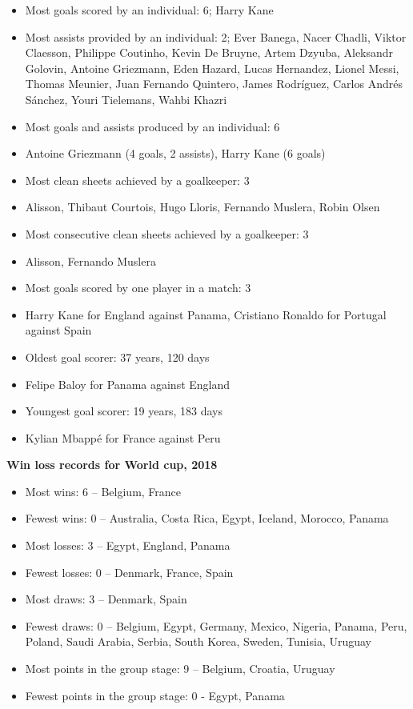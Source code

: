 \documentclass[
  openany]{book}
\providecommand{\tightlist}{%
  \setlength{\itemsep}{0pt}\setlength{\parskip}{0pt}}
\begin{document}
\begin{itemize}
\tightlist
\item
  Most goals scored by an individual: 6; Harry Kane
\item
  Most assists provided by an individual: 2; Ever Banega, Nacer Chadli, Viktor Claesson, Philippe Coutinho, Kevin De Bruyne, Artem Dzyuba, Aleksandr Golovin, Antoine Griezmann, Eden Hazard, Lucas Hernandez, Lionel Messi, Thomas Meunier, Juan Fernando Quintero, James Rodríguez, Carlos Andrés Sánchez, Youri Tielemans, Wahbi Khazri
\item
  Most goals and assists produced by an individual: 6
\item
  Antoine Griezmann (4 goals, 2 assists), Harry Kane (6 goals)
\item
  Most clean sheets achieved by a goalkeeper: 3
\item
  Alisson, Thibaut Courtois, Hugo Lloris, Fernando Muslera, Robin Olsen
\item
  Most consecutive clean sheets achieved by a goalkeeper: 3
\item
  Alisson, Fernando Muslera
\item
  Most goals scored by one player in a match: 3
\item
  Harry Kane for England against Panama, Cristiano Ronaldo for Portugal against Spain
\item
  Oldest goal scorer: 37 years, 120 days
\item
  Felipe Baloy for Panama against England
\item
  Youngest goal scorer: 19 years, 183 days
\item
  Kylian Mbappé for France against Peru
\end{itemize}

\textbf{Win loss records for World cup, 2018}

\begin{itemize}
\tightlist
\item
  Most wins: 6 -- Belgium, France
\item
  Fewest wins: 0 -- Australia, Costa Rica, Egypt, Iceland, Morocco, Panama
\item
  Most losses: 3 -- Egypt, England, Panama
\item
  Fewest losses: 0 -- Denmark, France, Spain
\item
  Most draws: 3 -- Denmark, Spain
\item
  Fewest draws: 0 -- Belgium, Egypt, Germany, Mexico, Nigeria, Panama, Peru, Poland, Saudi Arabia, Serbia, South Korea, Sweden, Tunisia, Uruguay
\item
  Most points in the group stage: 9 -- Belgium, Croatia, Uruguay
\item
  Fewest points in the group stage: 0 - Egypt, Panama
\end{itemize}
\end{document}

